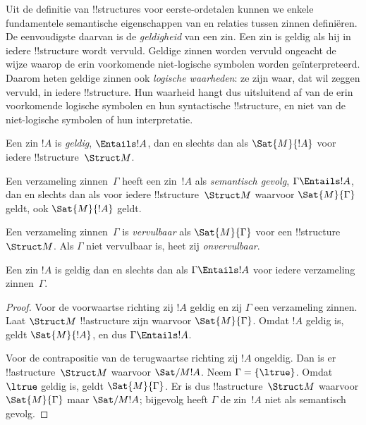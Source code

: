 \documentclass[openany]{memoir}
\begin{document}
\begin{explain}
Uit de definitie van !!{structure}s voor eerste-ordetalen kunnen we
enkele fundamentele semantische eigenschappen van en relaties tussen
zinnen definiëren. De eenvoudigste daarvan is de \emph{geldigheid} van
een zin. Een zin is geldig als hij in iedere !!{structure} wordt
vervuld. Geldige zinnen worden vervuld ongeacht de wijze waarop de
erin voorkomende niet-logische symbolen worden geïnterpreteerd.
Daarom heten geldige zinnen ook \emph{logische waarheden}: ze zijn
waar, dat wil zeggen vervuld, in iedere !!{structure}. Hun waarheid
hangt dus uitsluitend af van de erin voorkomende logische symbolen en
hun syntactische !!{structure}, en niet van de niet-logische symbolen
of hun interpretatie.
\end{explain}

\begin{defn}[Geldigheid]
Een zin $!A$ is \emph{geldig}, $\Entails !A$, dan en slechts dan als
$\Sat{M}{!A}$ voor iedere !!{structure}~$\Struct M$.
\end{defn}

\begin{defn}
Een verzameling zinnen~$\Gamma$ heeft een zin~$!A$ als
\emph{semantisch gevolg}, $\Gamma \Entails !A$, dan en slechts dan als
voor iedere !!{structure}~$\Struct M$ waarvoor $\Sat{M}{\Gamma}$ geldt,
ook $\Sat{M}{!A}$ geldt.
\end{defn}


\begin{defn}[Vervulbaarheid]
Een verzameling zinnen~$\Gamma$ is \emph{vervulbaar} als
$\Sat{M}{\Gamma}$ voor een !!{structure}~$\Struct M$. Als $\Gamma$
niet vervulbaar is, heet zij \emph{onvervulbaar}.
\end{defn}

\begin{prop}
Een zin $!A$ is geldig dan en slechts dan als $\Gamma \Entails !A$
voor iedere verzameling zinnen~$\Gamma$.
\end{prop}

\begin{proof}
Voor de voorwaartse richting zij $!A$ geldig en zij $\Gamma$ een
verzameling zinnen. Laat $\Struct M$ !!a{structure} zijn waarvoor
$\Sat{M}{\Gamma}$. Omdat $!A$ geldig is, geldt $\Sat{M}{!A}$, en dus
$\Gamma \Entails !A$.

Voor de contrapositie van de terugwaartse richting zij $!A$ ongeldig.
Dan is er !!a{structure}~$\Struct M$ waarvoor $\Sat/{M}{!A}$. Neem
$\Gamma = \{ \ltrue \}$. Omdat $\ltrue$ geldig is, geldt
$\Sat{M}{\Gamma}$. Er is dus !!a{structure}~$\Struct M$ waarvoor
$\Sat{M}{\Gamma}$ maar $\Sat/{M}{!A}$; bijgevolg heeft $\Gamma$ de
zin~$!A$ niet als semantisch gevolg.
\end{proof}
\end{document}
